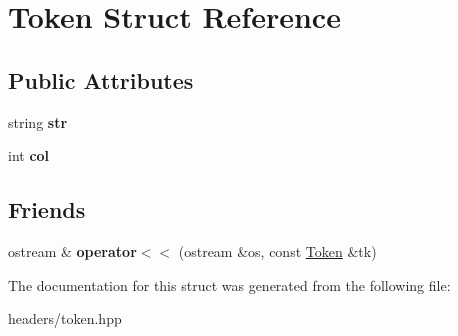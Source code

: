 \hypertarget{structToken}{}\section{Token Struct Reference}
\label{structToken}
\subsection*{Public Attributes}
\begin{DoxyCompactItemize}
\item 
\hypertarget{structToken_a76151761d946ed70bec26122b84aeab2}{}string {\bfseries str}\label{structToken_a76151761d946ed70bec26122b84aeab2}

\item 
\hypertarget{structToken_aa98f11feec3469c133a437da05a99061}{}int {\bfseries col}\label{structToken_aa98f11feec3469c133a437da05a99061}

\end{DoxyCompactItemize}
\subsection*{Friends}
\begin{DoxyCompactItemize}
\item 
\hypertarget{structToken_a171a897105e691527c8569cfc734c0b7}{}ostream \& {\bfseries operator$<$$<$} (ostream \&os, const \hyperlink{structToken}{Token} \&tk)\label{structToken_a171a897105e691527c8569cfc734c0b7}

\end{DoxyCompactItemize}


The documentation for this struct was generated from the following file\+:\begin{DoxyCompactItemize}
\item 
headers/token.\+hpp\end{DoxyCompactItemize}

